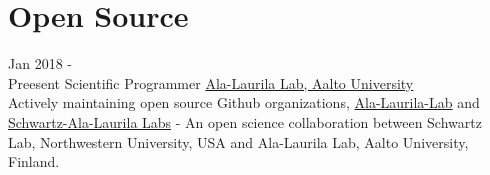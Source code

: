 \documentclass[letterpaper]{twentysecondcv} %
\begin{document}
\section{Open Source}
\begin{twenty}
	\twentyitem
    	{Jan 2018 - \\Preesent}
        {Scientific Programmer}
        {\href{http://ala-laurila.biosci.helsinki.fi/}{Ala-Laurila Lab, Aalto University}}
        {}
        {
        {\\Actively maintaining open source Github organizations, \href{https://github.com/ala-laurila-lab}{Ala-Laurila-Lab} and \href{https://github.com/Schwartz-AlaLaurila-Labs/}{Schwartz-Ala-Laurila Labs} - An open science collaboration between Schwartz Lab, Northwestern University, USA and Ala-Laurila Lab, Aalto University, Finland.
    }
        }
\end{twenty}
\end{document}
